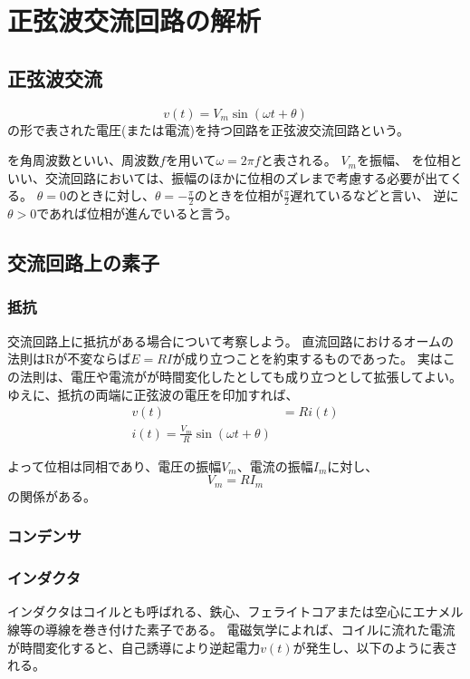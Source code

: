 \documentclass{ltjsreport}
\begin{document}
\section{正弦波交流回路の解析}

\subsection{正弦波交流}
\[
  v(t) = V_m \sin(\omega t + \theta)
\]
の形で表された電圧(または電流)を持つ回路を正弦波交流回路という。

\omega を角周波数といい、周波数$f$を用いて$\omega = 2 \pi f$と表される。
$V_m$を振幅、
\theta を位相といい、交流回路においては、振幅のほかに位相のズレまで考慮する必要が出てくる。
$\theta = 0$のときに対し、$\theta = -\frac{\pi}{2}$のときを位相が$\frac{\pi}{2}$遅れているなどと言い、
逆に$\theta >0 $であれば位相が進んでいると言う。

\subsection{交流回路上の素子}

\subsubsection{抵抗}
交流回路上に抵抗がある場合について考察しよう。
直流回路におけるオームの法則はRが不変ならば$E=RI$が成り立つことを約束するものであった。
実はこの法則は、電圧や電流がが時間変化したとしても成り立つとして拡張してよい。
ゆえに、抵抗の両端に正弦波の電圧を印加すれば、
\begin{align}
  v(t) &= Ri(t)\\
  i(t) = \frac{V_m}{R} \sin(\omega t + \theta)
\end{align}

よって位相は同相であり、電圧の振幅$V_m$、電流の振幅$I_m$に対し、
\[
  V_m = R I_m
\]
の関係がある。

\subsubsection{コンデンサ}


\subsubsection{インダクタ}
インダクタはコイルとも呼ばれる、鉄心、フェライトコアまたは空心にエナメル線等の導線を巻き付けた素子である。
電磁気学によれば、コイルに流れた電流が時間変化すると、自己誘導により逆起電力$v(t)$が発生し、以下のように表される。
\end{document}
